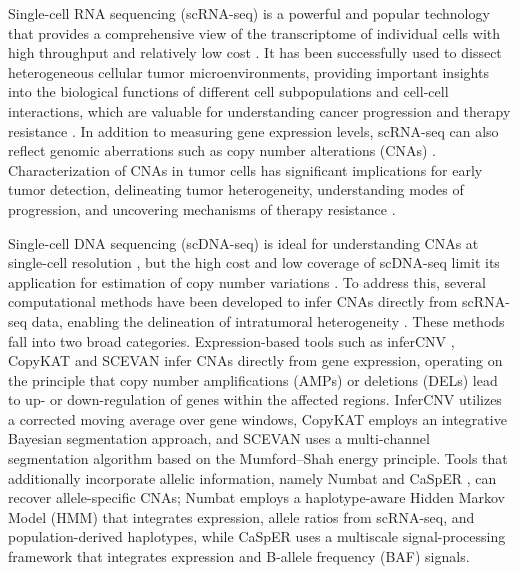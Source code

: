 \documentclass[11pt]{article}
\begin{document}
Single-cell RNA sequencing (scRNA-seq) is a powerful and popular technology that provides a comprehensive view of the transcriptome of individual cells with high throughput and relatively low cost \citep{tang2009mrna,macosko2015dropseq,zheng2017massively}. It has been successfully used to dissect heterogeneous cellular tumor microenvironments, providing important insights into the biological functions of different cell subpopulations and cell-cell interactions, which are valuable for understanding cancer progression and therapy resistance \citep{tirosh2016dissecting,puram2017scrna}. In addition to measuring gene expression levels, scRNA-seq can also reflect genomic aberrations such as copy number alterations (CNAs) \citep{patel2014single,muller2016single,fan2018linking,neftel2019integrative}. Characterization of CNAs in tumor cells has significant implications for early tumor detection, delineating tumor heterogeneity, understanding modes of progression, and uncovering mechanisms of therapy resistance \citep{beroukhim2010landscape}.

Single-cell DNA sequencing (scDNA-seq) is ideal for understanding CNAs at single-cell resolution \citep{navin2011tumour,gawad2016single,zahn2017scalable}, but the high cost and low coverage of scDNA-seq limit its application for estimation of copy number variations \citep{laks2019clonal,wang2014clonal}. To address this, several computational methods have been developed to infer CNAs directly from scRNA-seq data, enabling the delineation of intratumoral heterogeneity \citep{infercnv2018,gao2021copykat,defalco2023scevan,gao2022numbat,serin2020casper}. These methods fall into two broad categories. Expression-based tools such as inferCNV \citep{infercnv2018}, CopyKAT \citep{gao2021copykat} and SCEVAN \citep{defalco2023scevan} infer CNAs directly from gene expression, operating on the principle that copy number amplifications (AMPs) or deletions (DELs) lead to up- or down-regulation of genes within the affected regions. InferCNV utilizes a corrected moving average over gene windows, CopyKAT employs an integrative Bayesian segmentation approach, and SCEVAN uses a multi-channel segmentation algorithm based on the Mumford--Shah energy principle. Tools that additionally incorporate allelic information, namely Numbat \citep{gao2022numbat} and CaSpER \citep{serin2020casper}, can recover allele-specific CNAs; Numbat employs a haplotype-aware Hidden Markov Model (HMM) that integrates expression, allele ratios from scRNA-seq, and population-derived haplotypes, while CaSpER uses a multiscale signal-processing framework that integrates expression and B-allele frequency (BAF) signals.
\end{document}
